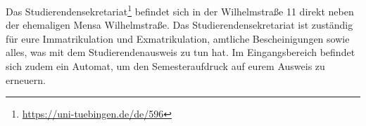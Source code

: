 Das Studierendensekretariat\footnote{\url{https://uni-tuebingen.de/de/596}} befindet sich in der Wilhelmstraße 11 direkt neben der ehemaligen Mensa Wilhelmstraße. Das Studierendensekretariat ist zuständig für eure Immatrikulation und Exmatrikulation, amtliche Bescheinigungen sowie alles, was mit dem Studierendenausweis zu tun hat. Im Eingangsbereich befindet sich zudem ein Automat, um den Semesteraufdruck auf eurem Ausweis zu erneuern.	%
